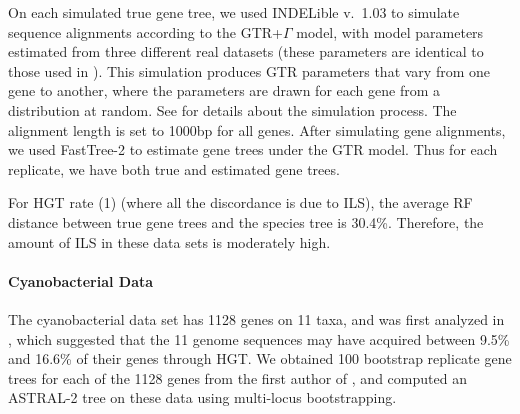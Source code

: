  
On each simulated true gene tree, we used INDELible
 \cite{Indelible} v.~1.03  to simulate sequence alignments according to the GTR+$\Gamma$ model,  with model parameters estimated from three different real datasets (these parameters are identical to those 
used in \cite{ASTRAL2}). 
This simulation  produces 
GTR parameters that vary from one gene to another,
where the parameters are drawn for each gene from a distribution at random. 
See \cite{ASTRAL2} for details about the simulation process.
The alignment length is set to 1000bp for all genes. 
After simulating gene alignments, we used FastTree-2 \cite{price2010fasttree} to estimate gene trees under the GTR model.  Thus for each replicate, we have both true and estimated gene trees.  

For HGT rate (1) (where all the discordance is due to ILS), 
the average RF \cite{RF} distance between 
true gene trees and the species tree is 30.4\%.  
Therefore, the amount of ILS in these data sets is moderately high. 




\paragraph{Cyanobacterial Data}\label{hgt::}

The cyanobacterial data set has
1128 genes on 11 taxa, and was first analyzed in \cite{Cyanobacteria}, which 
suggested that the 11 genome sequences may 
have acquired between 9.5\% and 16.6\% of their genes through HGT.  
We obtained 100 bootstrap replicate gene trees
for each of the 1128 genes from the first author of \cite{BansalHGTProkaryotes}, and computed
an ASTRAL-2 tree on these data using multi-locus bootstrapping.



